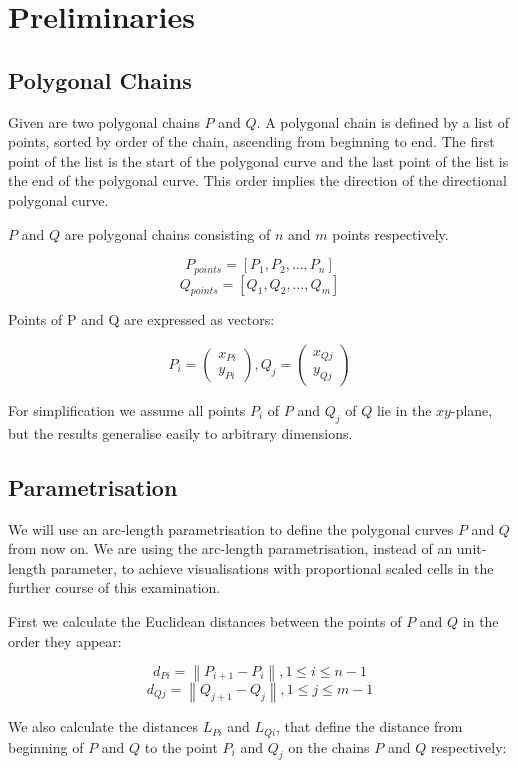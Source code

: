 \section{Preliminaries}
\subsection{Polygonal Chains}

Given are two polygonal chains $P$ and $Q$. A polygonal chain is defined by a list of points, sorted by order of the chain, ascending from beginning to end. The first point of the list is the start of the polygonal curve and the last point of the list is the end of the polygonal curve. This order implies the direction of the directional polygonal curve.

$P$ and $Q$ are polygonal chains consisting of $n$ and $m$ points respectively.

$$P_{points} = [P_1, P_2, …, P_n]$$
$$Q_{points} = [Q_1, Q_2, …, Q_m]$$

Points of P and Q are expressed as vectors:

$$P_{i} = \begin{pmatrix}x_{Pi} \\ y_{Pi}\end{pmatrix}, Q_{j} = \begin{pmatrix}x_{Qj} \\ y_{Qj}\end{pmatrix}$$

For simplification we assume all points $P_{i}$ of $P$ and $Q_{j}$ of $Q$ lie in the $xy$-plane, but the results generalise easily to arbitrary dimensions\cite{rotelex}.

\subsection{Parametrisation}

We will use an arc-length parametrisation to define the polygonal curves $P$ and $Q$ from now on. We are using the arc-length parametrisation, instead of an unit-length parameter, to achieve visualisations with proportional scaled cells in the further course of this examination.

First we calculate the Euclidean distances between the points of $P$ and $Q$ in the order they appear:

$$d_{Pi} = \left\|P_{i+1} - P_{i}\right\|, 1 \leq i \leq n-1$$
$$d_{Qj} = \left\|Q_{j+1} - Q_{j}\right\|, 1 \leq j \leq m-1$$

We also calculate the distances $L_{Pi}$ and $L_{Qi}$, that define the distance from beginning of $P$ and $Q$ to the point $P_i$ and $Q_j$ on the chains $P$ and $Q$ respectively:

